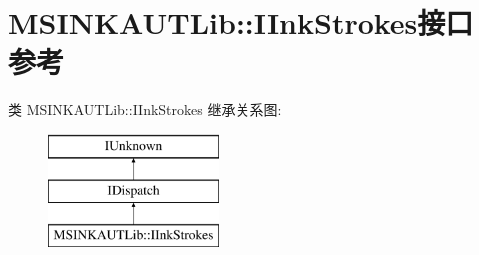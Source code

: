 \hypertarget{interface_m_s_i_n_k_a_u_t_lib_1_1_i_ink_strokes}{}\section{M\+S\+I\+N\+K\+A\+U\+T\+Lib\+:\+:I\+Ink\+Strokes接口 参考}
\label{interface_m_s_i_n_k_a_u_t_lib_1_1_i_ink_strokes}
类 M\+S\+I\+N\+K\+A\+U\+T\+Lib\+:\+:I\+Ink\+Strokes 继承关系图\+:\begin{figure}[H]
\begin{center}
\leavevmode
\includegraphics[height=3.000000cm]{interface_m_s_i_n_k_a_u_t_lib_1_1_i_ink_strokes}
\end{center}
\end{figure}
